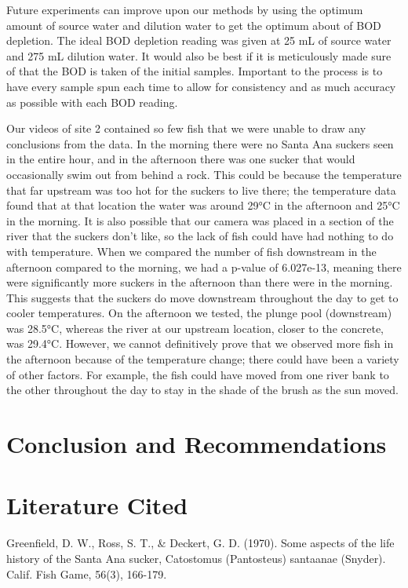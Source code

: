 \documentclass{article}\usepackage[]{graphicx}\usepackage[]{color}
\begin{document}
Future experiments can improve upon our methods by using the optimum amount of source water and dilution water to get the optimum about of BOD depletion. The ideal BOD depletion reading was given at 25 mL of source water and 275 mL dilution water. It would also be best if it is meticulously made sure of that the BOD is taken of the initial samples. Important to the process is to have every sample spun each time to allow for consistency and as much accuracy as possible with each BOD reading. 

Our videos of site 2 contained so few fish that we were unable to draw any conclusions from the data.  In the morning there were no Santa Ana suckers seen in the entire hour, and in the afternoon there was one sucker that would occasionally swim out from behind a rock.  This could be because the temperature that far upstream was too hot for the suckers to live there; the temperature data found that at that location the water was around 29°C in the afternoon and 25°C in the morning.  It is also possible that our camera was placed in a section of the river that the suckers don’t like, so the lack of fish could have had nothing to do with temperature.
When we compared the number of fish downstream in the afternoon compared to the morning, we had a p-value of 6.027e-13, meaning there were significantly more suckers in the afternoon than there were in the morning.  This suggests that the suckers do move downstream throughout the day to get to cooler temperatures.  On the afternoon we tested, the plunge pool (downstream) was 28.5°C, whereas the river at our upstream location, closer to the concrete, was 29.4°C.  However, we cannot definitively prove that we observed more fish in the afternoon because of the temperature change; there could have been a variety of other factors.  For example, the fish could have moved from one river bank to the other throughout the day to stay in the shade of the brush as the sun moved.

\section{Conclusion and Recommendations}


\section{Literature Cited}




Greenfield, D. W., Ross, S. T., \& Deckert, G. D. (1970). Some aspects of the life history of the Santa Ana sucker, Catostomus (Pantosteus) santaanae (Snyder). Calif. Fish Game, 56(3), 166-179. 
\end{document}

